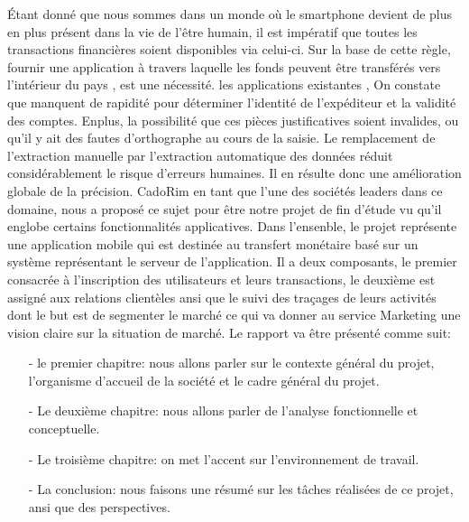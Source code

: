 Étant donné que nous sommes dans un monde où le smartphone devient de plus en plus présent dans la vie  de l'être humain, il est impératif que toutes les transactions financières soient disponibles via celui-ci.  Sur la base de cette règle, fournir une application à travers laquelle les fonds peuvent être transférés vers l'intérieur du pays , est une nécessité.  les applications existantes , On constate que manquent de rapidité pour déterminer l'identité de l'expéditeur et la validité des comptes. Enplus, la possibilité que ces pièces justificatives soient invalides, ou qu'il y ait des fautes d'orthographe au cours de la saisie.\newline
Le remplacement de l’extraction manuelle par l’extraction automatique des données réduit considérablement le risque d’erreurs humaines. Il en résulte donc une amélioration globale de la précision.\newline
CadoRim en tant que l'une des sociétés leaders dans ce domaine, nous a proposé ce sujet pour être notre projet de fin d'étude vu qu'il englobe certains  fonctionnalités applicatives. Dans l'ensenble, le projet représente une application mobile qui est destinée au transfert monétaire basé sur un système représentant le serveur de l'application. Il a deux composants, le premier consacrée à l'inscription des utilisateurs et leurs transactions, le deuxième est assigné aux relations clientèles ansi que le suivi des traçages de leurs activités dont le but est de segmenter le marché ce qui va donner au service Marketing une vision claire sur la situation de marché.  Le rapport va être présenté comme suit: 
\begin{enumerate}
	\item[-]le premier chapitre: nous allons parler sur le contexte général du projet, l'organisme d'accueil de la société et le cadre général du projet.
	\item[-] Le deuxième chapitre: nous allons parler de l'analyse fonctionnelle et conceptuelle.
	\item[-] Le troisième chapitre: on met l'accent sur l'environnement de travail.
	\item[-] La conclusion: nous faisons une résumé sur les tâches réalisées de ce projet, ansi que des perspectives.
	
\end{enumerate}









